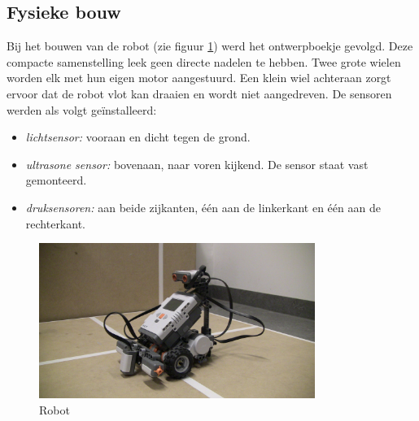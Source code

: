 \documentclass[tt3]{penoverslag}
\begin{document}
\subsection{Fysieke bouw} %
\label{ssec:fysbouw}
Bij het bouwen van de robot (zie figuur \ref{robot}) werd het ontwerpboekje gevolgd. Deze compacte samenstelling leek geen directe nadelen te hebben. Twee grote wielen worden elk met hun eigen motor aangestuurd. Een klein wiel achteraan zorgt ervoor dat de robot vlot kan draaien en wordt niet aangedreven. De sensoren werden als volgt ge\"installeerd: 

\begin{itemize}
\item \textit{lichtsensor:} vooraan en dicht tegen de grond.
\item \textit{ultrasone sensor:} bovenaan, naar voren kijkend. De sensor staat vast gemonteerd.
\item \textit{druksensoren:} aan beide zijkanten, \'e\'en aan de linkerkant en \'e\'en aan de rechterkant.
\end{itemize}

\begin{figure}[tbp]
\begin{center}
    \includegraphics[width=0.8\textwidth]{robot}
    \caption{Robot}
    \label{robot}
\end{center}
\end{figure}
\end{document}

